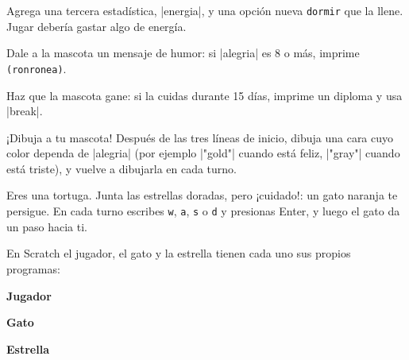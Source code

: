 \begin{challenge}
\tick Agrega una tercera estadística, \py|energia|, y una opción nueva \texttt{dormir} que la llene. Jugar debería gastar algo de energía.\par
\tick Dale a la mascota un mensaje de humor: si \py|alegria| es 8 o más, imprime \texttt{(ronronea)}.\par
\tick Haz que la mascota gane: si la cuidas durante 15 días, imprime un diploma y usa \py|break|.\par
\tick ¡Dibuja a tu mascota! Después de las tres líneas de inicio, dibuja una cara cuyo color dependa de \py|alegria| (por ejemplo \py|"gold"| cuando está feliz, \py|"gray"| cuando está triste), y vuelve a dibujarla en cada turno.
\end{challenge}


Eres una tortuga. Junta las estrellas doradas, pero ¡cuidado!: un gato naranja te persigue. En cada turno escribes \texttt{w}, \texttt{a}, \texttt{s} o \texttt{d} y presionas Enter, y luego el gato da un paso hacia ti.

En Scratch el jugador, el gato y la estrella tienen cada uno sus propios programas:

\begin{center}
\begin{minipage}[t]{0.32\linewidth}
\textbf{Jugador}\par
\begin{scratch}[scale=0.72]
\end{scratch}
\end{minipage}\hfill
\begin{minipage}[t]{0.32\linewidth}
\textbf{Gato}\par
\begin{scratch}[scale=0.66]
\end{scratch}
\end{minipage}\hfill
\begin{minipage}[t]{0.32\linewidth}
\textbf{Estrella}\par
\begin{scratch}[scale=0.66]
\end{scratch}
\end{minipage}
\end{center}


